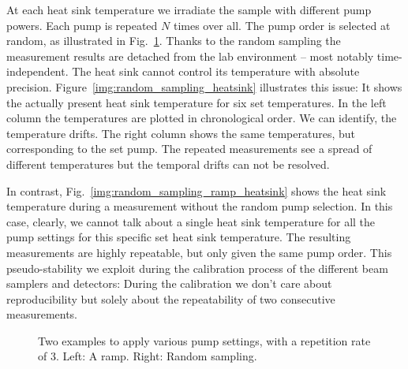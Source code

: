 At each heat sink temperature
we irradiate the sample
with different pump powers.
Each pump is repeated $N$ times over all.
The pump order is selected at random,
as illustrated in Fig.~\ref{img:random_sampling}.
Thanks to the random sampling
the measurement results
are detached from the lab environment --
most notably time-independent.
The heat sink cannot control its temperature
with absolute precision.
Figure~\ref{img:random_sampling_heatsink}
illustrates this issue:
It shows
the actually present heat sink temperature
for six set temperatures.
In the left column
the temperatures are plotted
in chronological order.
We can identify,
the temperature drifts.
The right column shows the same temperatures,
but corresponding to the set pump.
The repeated measurements
see a spread of different temperatures
but the temporal drifts can not be resolved.

In contrast,
Fig.~\ref{img:random_sampling_ramp_heatsink}
shows the heat sink temperature
during a measurement without the random pump selection.
In this case, clearly,
we cannot talk about a single heat sink temperature
for all the pump settings
for this specific set heat sink temperature.
The resulting measurements are highly repeatable,
but only given the same pump order.
This pseudo-stability
we exploit
during the calibration process
of the different beam samplers
and detectors:
During the calibration
we don't care about reproducibility
but solely about the repeatability
of two consecutive measurements.

\begin{figure}
\centering
{}
\caption{Two examples to apply various pump settings, with a repetition rate of 3.
Left: A ramp. Right: Random sampling.}
\label{img:random_sampling}
\end{figure}

